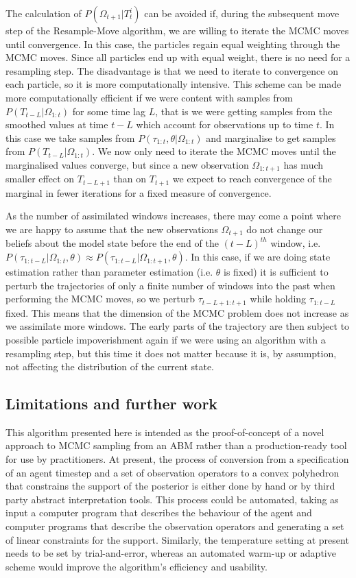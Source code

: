 \documentclass{article}
\begin{document}
The calculation of $P(\Omega_{t+1}|T^i_t)$ can be avoided if, during the subsequent move step of the Resample-Move algorithm, we are willing to iterate the MCMC moves until convergence. In this case, the particles regain equal weighting through the MCMC moves. Since all particles end up with equal weight, there is no need for a resampling step. The disadvantage is that we need to iterate to convergence on each particle, so it is more computationally intensive. This scheme can be made more computationally efficient if we were content with samples from $P(T_{t-L}|\Omega_{1:t})$ for some time lag $L$, that is we were getting samples from the smoothed values at time $t-L$ which account for observations up to time $t$. In this case we take samples from $P(\tau_{1:t},\theta|\Omega_{1:t})$ and marginalise to get samples from $P(T_{t-L}|\Omega_{1:t})$. We now only need to iterate the MCMC moves until the marginalised values converge, but since a new observation $\Omega_{1:t+1}$ has much smaller effect on $T_{t-L+1}$ than on $T_{t+1}$ we expect to reach convergence of the marginal in fewer iterations for a fixed measure of convergence.

As the number of assimilated windows increases, there may come a point where we are happy to assume that the new observations $\Omega_{t+1}$ do not change our beliefs about the model state before the end of the $(t-L)^{th}$ window, i.e. $P(\tau_{1:t-L}|\Omega_{1:t},\theta) \approx P(\tau_{1:t-L}|\Omega_{1:t+1},\theta)$. In this case, if we are doing state estimation rather than parameter estimation (i.e. $\theta$ is fixed) it is sufficient to perturb the trajectories of only a finite number of windows into the past when performing the MCMC moves, so we perturb $\tau_{t-L+1:t+1}$ while holding $\tau_{1:t-L}$ fixed. This means that the dimension of the MCMC problem does not increase as we assimilate more windows. The early parts of the trajectory are then subject to possible particle impoverishment again if we were using an algorithm with a resampling step, but this time it does not matter because it is, by assumption, not affecting the distribution of the current state.

\subsection{Limitations and further work}

This algorithm presented here is intended as the proof-of-concept of a novel approach to MCMC sampling from an ABM rather than a production-ready tool for use by practitioners. At present, the process of conversion from a specification of an agent timestep and a set of observation operators to a convex polyhedron that constrains the support of the posterior is either done by hand or by third party abstract interpretation tools. This process could be automated, taking as input a computer program that describes the behaviour of the agent and computer programs that describe the observation operators and generating a set of linear constraints for the support. Similarly, the temperature setting at present needs to be set by trial-and-error, whereas an automated warm-up or adaptive scheme would improve the algorithm's efficiency and usability.
\end{document}
